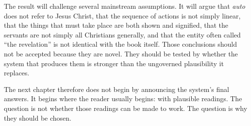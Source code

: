 The result will challenge several mainstream assumptions. It will argue that \textit{auto} does not refer to Jesus Christ, that the sequence of actions is not simply linear, that the things that must take place are both shown and signified, that the servants are not simply all Christians generally, and that the entity often called ``the revelation'' is not identical with the book itself. Those conclusions should not be accepted because they are novel. They should be tested by whether the system that produces them is stronger than the ungoverned plausibility it replaces.

The next chapter therefore does not begin by announcing the system's final answers. It begins where the reader usually begins: with plausible readings. The question is not whether those readings can be made to work. The question is why they should be chosen.

